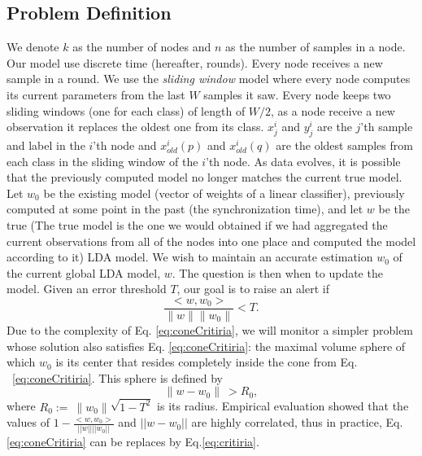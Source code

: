 \documentclass{sig-alternate-05-2015}
\begin{document}
\subsection{Problem Definition}
We denote $k$ as the number of nodes and
$n$ as the number of samples in a node.
Our model use discrete time (hereafter, rounds). Every node receives a new sample
in a round.
We use the \textit{sliding window} model where every node computes its current
parameters from the last $W$ samples it saw.
Every node keeps two sliding windows (one for each class) of length of $W/2$, as
a node receive a new observation it replaces the oldest one from its class.
$x^i_j$ and $y^i_j$ are the $j$'th sample and label in the $i$'th node
and $x_{old}^i(p)$ and $x_{old}^i(q)$ are the oldest samples from each class in
the sliding window of the $i$'th node.
As data evolves, it is possible that the previously computed model
no longer matches the current true model.
Let $w_0$ be the existing model (vector of weights of a linear classifier),
previously computed at some point in the past (the synchronization time),
and let $w$ be the true
(The true model is the one we would obtained if we had aggregated the current observations
from all of the nodes into one place and computed the model according to it) LDA
model.
We wish to maintain an accurate estimation $w_0$ of the current global LDA model, $w$.
The question is then when to update the model.
Given an error threshold $T$, our goal is to raise an alert if
\begin{equation} \label{eq:coneCritiria}
\frac{<w,w_0>}{\parallel w \parallel \parallel w_0 \parallel}  < T.
\end{equation}
Due to the complexity of Eq. \ref{eq:coneCritiria},
we will monitor a simpler problem whose solution also satisfies
Eq. \ref{eq:coneCritiria}: the maximal volume sphere of which $w_0$ is its center
that resides completely inside the cone from Eq. ~\ref{eq:coneCritiria}.
This sphere is defined by
\begin{equation} \label{eq:critiria}
\parallel w-w_0 \parallel \  >  R_0,
\end{equation}
where $R_0 := \  \parallel w_0 \parallel \sqrt{1-T^2}$ is its radius.
Empirical evaluation showed that the values of
$1-\frac{<w,w_0>}{||w||||w_0||}$ and $||w-w_0||$ are
highly  correlated, thus in practice, Eq. \ref{eq:coneCritiria}
can be replaces by Eq.\ref{eq:critiria}.
\end{document}

